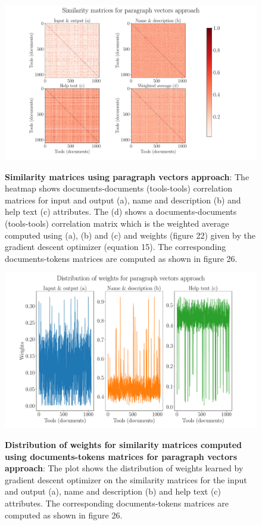 \begin{figure}[h]
\begin{centering}    
    {\includegraphics[scale=0.4]{figures/Similarity_matrices_doc2vec.pdf}}
    \caption[Similarity matrices using paragraph vectors approach]{\textbf{Similarity matrices using paragraph vectors approach}: The heatmap shows documents-documents (tools-tools) correlation matrices for input and output (a), name and description (b) and help text (c) attributes. The (d) shows a documents-documents (tools-tools) correlation matrix which is the weighted average computed using (a), (b) and (c) and weights (figure 22) given by the gradient descent optimizer (equation 15). The corresponding documents-tokens matrices are computed as shown in figure 26.}
\end{centering}
\end{figure}

\begin{figure}[h]
\begin{centering}
    {\includegraphics[scale=0.35]{figures/Weights_doc2vec.pdf}}
    \caption[Distribution of weights for similarity matrices computed using documents-tokens matrices for paragraph vectors approach]{\textbf{Distribution of weights for similarity matrices computed using documents-tokens matrices for paragraph vectors approach}: The plot shows the distribution of weights learned by gradient descent optimizer on the similarity matrices for the input and output (a), name and description (b) and help text (c) attributes. The corresponding documents-tokens matrices are computed as shown in figure 26. }
\end{centering}
\end{figure}

